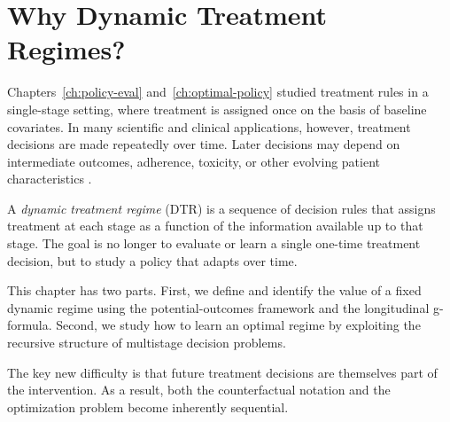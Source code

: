 \documentclass[master.tex]{subfiles}
\begin{document}

\section{Why Dynamic Treatment Regimes?}
\label{w15:sec:motivation}

Chapters~\ref{ch:policy-eval} and~\ref{ch:optimal-policy} studied treatment rules in a single-stage setting, where treatment is assigned once on the basis of baseline covariates. In many scientific and clinical applications, however, treatment decisions are made repeatedly over time. Later decisions may depend on intermediate outcomes, adherence, toxicity, or other evolving patient characteristics \citep{moodie2007}.

A \emph{dynamic treatment regime} (DTR) is a sequence of decision rules that assigns treatment at each stage as a function of the information available up to that stage. The goal is no longer to evaluate or learn a single one-time treatment decision, but to study a policy that adapts over time.

This chapter has two parts. First, we define and identify the value of a fixed dynamic regime using the potential-outcomes framework and the longitudinal g-formula. Second, we study how to learn an optimal regime by exploiting the recursive structure of multistage decision problems.

The key new difficulty is that future treatment decisions are themselves part of the intervention. As a result, both the counterfactual notation and the optimization problem become inherently sequential.
\end{document}
